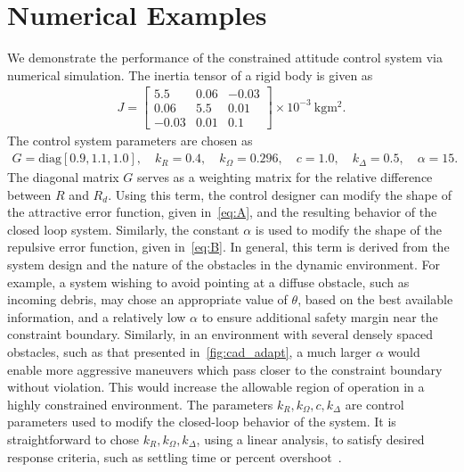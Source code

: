 \section{Numerical Examples}\label{sec:constrained_attitude_control_numerical_example}

We demonstrate the performance of the constrained attitude control system via numerical simulation.
The inertia tensor of a rigid body is given as
\begin{gather*}
    J = \begin{bmatrix}
	\num{5.5} & \num{0.06} & \num{-0.03} \\
	\num{0.06} & \num{5.5} & \num{0.01} \\
	\num{-0.03} & \num{0.01} & \num{0.1}
    \end{bmatrix} \times 10^{-3}~\si{\kilo\gram\meter\squared} .
\end{gather*} 
The control system parameters are chosen as
\begin{gather*}
	G = \text{diag} [0.9,1.1,1.0], \quad k_R = 0.4 , \quad	k_\Omega = 0.296 ,\quad
	c = 1.0 , \quad k_\Delta = 0.5 , \quad \alpha = 15 .
\end{gather*}
The diagonal matrix \( G \) serves as a weighting matrix for the relative difference between \( R \) and \( R_d \). 
Using this term, the control designer can modify the shape of the attractive error function, given in~\cref{eq:A}, and the resulting behavior of the closed loop system.
Similarly, the constant \( \alpha \) is used to modify the shape of the repulsive error function, given in~\cref{eq:B}.
In general, this term is derived from the system design and the nature of the obstacles in the dynamic environment.
For example, a system wishing to avoid pointing at a diffuse obstacle, such as incoming debris, may chose an appropriate value of \( \theta \), based on the best available information, and a relatively low \( \alpha \) to ensure additional safety margin near the constraint boundary. 
Similarly, in an environment with several densely spaced obstacles, such as that presented in~\cref{fig:cad_adapt}, a much larger \( \alpha \) would enable more aggressive maneuvers which pass closer to the constraint boundary without violation.
This would increase the allowable region of operation in a highly constrained environment.
The parameters \( k_R, k_\Omega, c, k_\Delta\) are control parameters used to modify the closed-loop behavior of the system.
It is straightforward to chose \( k_R, k_\Omega, k_\Delta\), using a linear analysis, to satisfy desired response criteria, such as settling time or percent overshoot~\cite{nise2004}.

